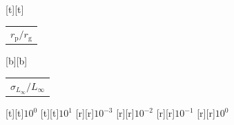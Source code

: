 %    
%
%
\begin{psfrags}%
\psfragscanon%
%
[t][t]{\color[rgb]{0,0,0}\setlength{\tabcolsep}{0pt}\begin{tabular}{c}{\Large$r_\mathrm{p}/r_\mathrm{g}$}\end{tabular}}%
[b][b]{\color[rgb]{0,0,0}\setlength{\tabcolsep}{0pt}\begin{tabular}{c}{\Large$\sigma_{L_\infty}/L_\infty$}\end{tabular}}%
%
[t][t]{$10^{0}$}%
[t][t]{$10^{1}$}%
%
[r][r]{$10^{-3}$}%
[r][r]{$10^{-2}$}%
[r][r]{$10^{-1}$}%
[r][r]{$10^{0}$}%
%
%
\end{psfrags}%
%
